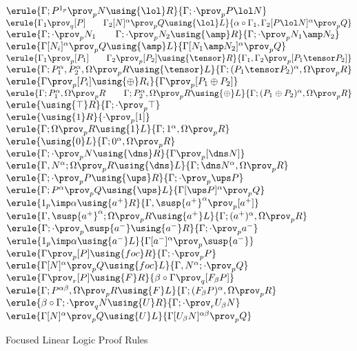 \def\provp{\prov_p}
\def\provq{\prov_q}
\begin{figure}
\begin{center}
\footnotesize
{}
$
\erule
{\Gamma; P^{1_p} \provp  N \using {\lol}R}
{\Gamma; \cdot \provp P \lol N}
$
\gap
$
\erule
{\Gamma_1 \provq [P] \qquad \Gamma_2[N]^\alpha \provp Q \using {\lol}L}
{\alpha \circ \Gamma_1,\Gamma_2 [P \lol N]^\alpha \provp Q}
$
\gap
$
\erule
{\Gamma;\cdot\provp N_1  \qquad \Gamma;\cdot\provp N_2 \using {\amp}R}
{\Gamma;\cdot\provp N_1\amp N_2 }
$
\gap
$
\erule
{\Gamma [N_i]^\alpha \provp Q \using {\amp}L}
{\Gamma [N_1 \amp N_2]^\alpha \provp Q}
$
\gap
$
\erule
{\Gamma_1 \provp [P_1] \qquad \Gamma_2 \provp [P_2]\using {\tensor}R}
{\Gamma_1, \Gamma_2  \provp [P_1 \tensor P_2]}
$
\gap
$
\erule
{\Gamma; P_1^\alpha, P_2^\alpha, \Omega \provp R \using {\tensor}L}
{\Gamma; (P_1\tensor P_2)^\alpha, \Omega  \provp  R}
$
\gap
$
\erule
{\Gamma \provp [P_i] \using {\oplus}R_i}
{\Gamma  \provp [P_1 \oplus P_2]}
$
\gap
$
\erule
{\Gamma; P_1^\alpha, \Omega \provp R \qquad \Gamma; P_2^\alpha, \Omega \provp R\using {\oplus}L}
{\Gamma; (P_1\oplus P_2)^\alpha, \Omega \provp R}
$
\gap
$
\erule
{\using {\top}R}
{\Gamma;\cdot  \provp \top}
$
\gap
$
\erule
{\using {1}R}
{\cdot  \provp [1]}
$
\gap
$
\erule
{\Gamma; \Omega \provp R \using {1}L}
{\Gamma; 1^\alpha, \Omega \provp R}
$
\gap
$
\erule
{\using {0}L}
{\Gamma; 0^\alpha, \Omega \provp R}
$
\gap
$
\erule
{\Gamma;\cdot \provp N\using {\dns}R}
{\Gamma  \provp [\dns N]}
$
\gap
$
\erule
{\Gamma, N^\alpha; \Omega \provp R \using {\dns}L}
{\Gamma; \dns N^\alpha,  \Omega \provp R}
$
\gap
$
\erule
{\Gamma; \cdot \provp P\using {\ups}R}
{\Gamma; \cdot  \provp \ups P}
$
\gap
$
\erule
{\Gamma; P^\alpha\provp Q \using {\ups}L}
{\Gamma[\ups P]^\alpha \provp Q}
$
\gap
$
\erule
{1_p \imp \alpha \using {a^+}R}
{\Gamma, \susp{a^+}^\alpha  \provp [a^+ ]}
$
\gap
$
\erule
{\Gamma, \susp{a^+}^\alpha; \Omega\provp R \using {a^+}L}
{\Gamma;  (a^+)^\alpha, \Omega  \provp R}
$
\gap
$
\erule
{\Gamma; \cdot \provp \susp{a^-}\using {a^-}R}
{\Gamma; \cdot  \provp a^-}
$
\gap
$
\erule
{1_p \imp \alpha \using {a^-}L }
{\Gamma[a^-]^\alpha \provp \susp{a^-}}
$
\break
$
\erule
{\Gamma \provp [P]\using {foc}R}
{\Gamma;\cdot  \provp P}
$
\gap
$
\erule
{\Gamma[N]^\alpha \provp Q\using {foc}L}
{\Gamma,N^\alpha;\cdot  \provp Q}
$
\break
$
\erule
{\Gamma \prov_r [P]\using {F}R}
{\beta \circ \Gamma  \provq [F_\beta P]}
$
\gap
$
\erule
{\Gamma; P^{\alpha\beta}, \Omega  \provp R\using {F}L}
{\Gamma;(F_\beta P)^\alpha, \Omega  \provp R}
$
\break
$
\erule
{ \beta \circ \Gamma;\cdot\provq N \using {U}R}
{\Gamma;\cdot\prov_r U_\beta N }
$
\gap
$
\erule
{\Gamma [N]^\alpha \provp Q \using {U}L}
{\Gamma [U_\beta N]^{\alpha\beta} \provp Q}
$
\end{center}
\caption{Focused Linear Logic Proof Rules \label{foc-rules}}
\end{figure}
